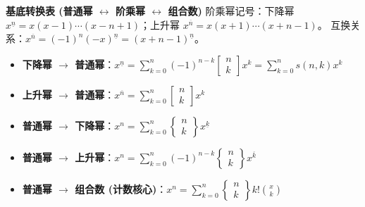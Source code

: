 \textbf{基底转换表 (普通幂 $\leftrightarrow$ 阶乘幂 $\leftrightarrow$ 组合数)}
阶乘幂记号：下降幂 $x^{\underline{n}} = x(x-1)\cdots(x-n+1)$；上升幂 $x^{\overline{n}} = x(x+1)\cdots(x+n-1)$。
互换关系：$x^{\overline{n}} = (-1)^n (-x)^{\underline{n}} = (x+n-1)^{\underline{n}}$。
\begin{itemize}
    \item \textbf{下降幂 $\to$ 普通幂}：$x^{\underline{n}} = \sum_{k=0}^n (-1)^{n-k} \left[ \begin{matrix} n \\ k \end{matrix} \right] x^k = \sum_{k=0}^n s(n, k) x^k$
    \item \textbf{上升幂 $\to$ 普通幂}：$x^{\overline{n}} = \sum_{k=0}^n \left[ \begin{matrix} n \\ k \end{matrix} \right] x^k$
    \item \textbf{普通幂 $\to$ 下降幂}：$x^n = \sum_{k=0}^n \left\{ \begin{matrix} n \\ k \end{matrix} \right\} x^{\underline{k}}$
    \item \textbf{普通幂 $\to$ 上升幂}：$x^n = \sum_{k=0}^n (-1)^{n-k} \left\{ \begin{matrix} n \\ k \end{matrix} \right\} x^{\overline{k}}$
    \item \textbf{普通幂 $\to$ 组合数 (计数核心)}：$x^n = \sum_{k=0}^n \left\{ \begin{matrix} n \\ k \end{matrix} \right\} k! \binom{x}{k}$
\end{itemize}

